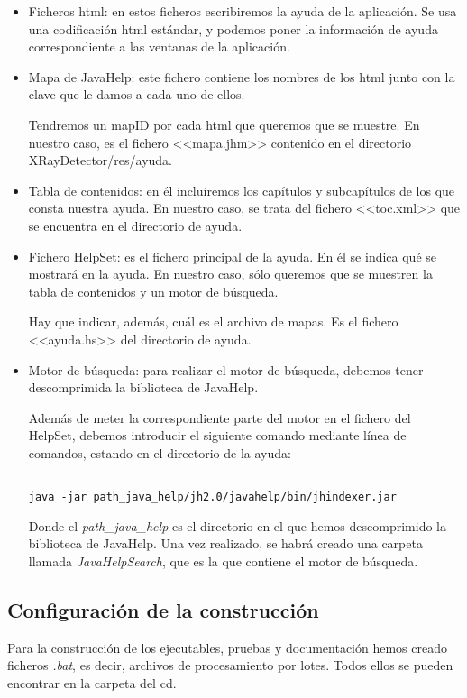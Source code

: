 \begin{itemize}
\item Ficheros html: en estos ficheros escribiremos la ayuda de la aplicación. Se usa una codificación html estándar, y podemos poner la información de ayuda correspondiente a las ventanas de la aplicación.
\item Mapa de JavaHelp: este fichero contiene los nombres de los html junto con la clave que le damos a cada uno de ellos.

Tendremos un mapID por cada html que queremos que se muestre. En nuestro caso, es el fichero <<mapa.jhm>> contenido en el directorio XRayDetector/res/ayuda.
\item Tabla de contenidos: en él incluiremos los capítulos y subcapítulos de los que consta nuestra ayuda. En nuestro caso, se trata del fichero <<toc.xml>> que se encuentra en el directorio de ayuda.
\item Fichero HelpSet: es el fichero principal de la ayuda. En él se indica qué se mostrará en la ayuda. En nuestro caso, sólo queremos que se muestren la tabla de contenidos y un motor de búsqueda.

Hay que indicar, además, cuál es el archivo de mapas. Es el fichero <<ayuda.hs>> del directorio de ayuda.
\item Motor de búsqueda: para realizar el motor de búsqueda, debemos tener descomprimida la biblioteca de JavaHelp.

Además de meter la correspondiente parte del motor en el fichero del HelpSet, debemos introducir el siguiente comando mediante línea de comandos, estando en el directorio de la ayuda:

\begin{verbatim}

java -jar path_java_help/jh2.0/javahelp/bin/jhindexer.jar

\end{verbatim}

Donde el \textit{path\_java\_help} es el directorio en el que hemos descomprimido la biblioteca de JavaHelp.
Una vez realizado, se habrá creado una carpeta llamada \textit{JavaHelpSearch}, que es la que contiene el motor de búsqueda.
\end{itemize}


\subsection{Configuración de la construcción}
Para la construcción de los ejecutables, pruebas y documentación hemos creado ficheros \textit{.bat}, es decir, archivos de procesamiento por lotes. Todos ellos se pueden encontrar en la carpeta del cd.


